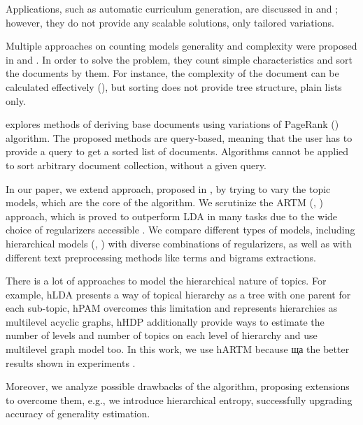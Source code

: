 \documentclass[12pt,twoside]{article}
\begin{document}
    Applications, such as automatic curriculum generation, are discussed in \cite{kisla13course} and \cite{pirrone05learning}; however, they do not provide any scalable solutions, only tailored variations. 
    
    Multiple approaches on counting models generality and complexity were proposed in \cite{eremeev19ranlp} and \cite{solovyev18assessment}. In order to solve the problem, they count simple characteristics and sort the documents by them. For instance, the complexity of the document can be calculated effectively (\cite{eremeev19ranlp}), but sorting does not provide tree structure, plain lists only.
    
    \cite{jardine14automatically} explores methods of deriving base documents using variations of PageRank (\cite{dode17textrank}) algorithm. The proposed methods are query-based, meaning that the user has to provide a query to get a sorted list of documents. Algorithms cannot be applied to sort arbitrary document collection, without a given query. 
    
    In our paper, we extend approach, proposed in \cite{conf/icde/KoutrikaLS15}, by trying to vary the topic models, which are the core of the algorithm. We scrutinize the ARTM (\cite{vorontsov2015additive}, \cite{vorontsov2015bigartm}) approach, which is proved to outperform LDA \cite{blei10lda} in many tasks due to the wide choice of regularizers accessible \cite{voron15mlj}. We compare different types of models, including hierarchical models (\cite{chirkova16hier}, \cite{journals/corr/abs-1811-02820}) with diverse combinations of regularizers, as well as with different text preprocessing methods like terms and bigrams extractions. 
    
    There is a lot of approaches to model the hierarchical nature of topics. For example, hLDA \cite{journals/jacm/BleiGJ10} presents a way of topical hierarchy as a tree with one parent for each sub-topic, hPAM \cite{oai:works.bepress.com:andrew_mccallum-1189} overcomes this limitation and represents hierarchies as multilevel acyclic graphs, hHDP \cite{journals/jmlr/ZavitsanosPV11} additionally provide ways to estimate the number of levels and number of topics on each level of hierarchy and use multilevel graph model too. In this work, we use hARTM because ща the better results shown in experiments \cite{journals/corr/abs-1811-02820}.
    
    Moreover, we analyze possible drawbacks of the algorithm, proposing extensions to overcome them, e.g., we introduce hierarchical entropy, successfully upgrading accuracy of generality estimation.
    
\end{document}
